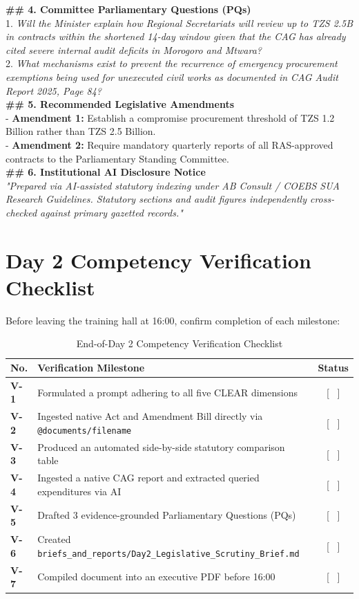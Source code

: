 \documentclass[11pt, a4paper]{report}
\begin{document}
\begin{tcolorbox}[colback=lightgrey, colframe=bordergrey, title=\textbf{Deliverable 2 Preview: \texttt{Day2\_Legislative\_Scrutiny\_Brief.md}}]
\textbf{\#\# 4. Committee Parliamentary Questions (PQs)}\\
1. \textit{Will the Minister explain how Regional Secretariats will review up to TZS 2.5B in contracts within the shortened 14-day window given that the CAG has already cited severe internal audit deficits in Morogoro and Mtwara?}\\
2. \textit{What mechanisms exist to prevent the recurrence of emergency procurement exemptions being used for unexecuted civil works as documented in CAG Audit Report 2025, Page 84?}\\[0.2cm]
\textbf{\#\# 5. Recommended Legislative Amendments}\\
- \textbf{Amendment 1:} Establish a compromise procurement threshold of TZS 1.2 Billion rather than TZS 2.5 Billion.\\
- \textbf{Amendment 2:} Require mandatory quarterly reports of all RAS-approved contracts to the Parliamentary Standing Committee.\\[0.2cm]
\textbf{\#\# 6. Institutional AI Disclosure Notice}\\
\textit{"Prepared via AI-assisted statutory indexing under AB Consult / COEBS SUA Research Guidelines. Statutory sections and audit figures independently cross-checked against primary gazetted records."}
\end{tcolorbox}

\section{Day 2 Competency Verification Checklist}
Before leaving the training hall at 16:00, confirm completion of each milestone:

\begin{table}[htbp]
\centering
\caption{End-of-Day 2 Competency Verification Checklist}
\vspace{0.2cm}
\begin{tabular}{@{}>{\bfseries}p{1.2cm}p{10cm}c@{}}
\toprule
No. & Verification Milestone & Status \\
\midrule
V-1 & Formulated a prompt adhering to all five CLEAR dimensions & [ \ ] \\
V-2 & Ingested native Act and Amendment Bill directly via \texttt{@documents/filename} & [ \ ] \\
V-3 & Produced an automated side-by-side statutory comparison table & [ \ ] \\
V-4 & Ingested a native CAG report and extracted queried expenditures via AI & [ \ ] \\
V-5 & Drafted 3 evidence-grounded Parliamentary Questions (PQs) & [ \ ] \\
V-6 & Created \texttt{briefs\_and\_reports/Day2\_Legislative\_Scrutiny\_Brief.md} & [ \ ] \\
V-7 & Compiled document into an executive PDF before 16:00 & [ \ ] \\
\bottomrule
\end{tabular}
\end{table}
\end{document}
